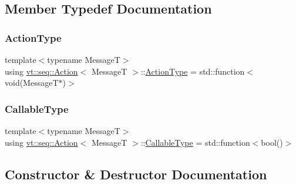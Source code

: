 \subsection{Member Typedef Documentation}
\mbox{\label{structvt_1_1seq_1_1_action_ae38fc2cf91f5654f548ea386ee603963}} 
\subsubsection{\texorpdfstring{Action\+Type}{ActionType}}
{\footnotesize\ttfamily template$<$typename MessageT$>$ \\
using \hyperlink{structvt_1_1seq_1_1_action}{vt\+::seq\+::\+Action}$<$ MessageT $>$\+::\hyperlink{structvt_1_1seq_1_1_action_ae38fc2cf91f5654f548ea386ee603963}{Action\+Type} =  std\+::function$<$void(MessageT$\ast$)$>$}

\mbox{\label{structvt_1_1seq_1_1_action_a6c683ecf97baa16ca6432b6773aa8f89}} 
\subsubsection{\texorpdfstring{Callable\+Type}{CallableType}}
{\footnotesize\ttfamily template$<$typename MessageT$>$ \\
using \hyperlink{structvt_1_1seq_1_1_action}{vt\+::seq\+::\+Action}$<$ MessageT $>$\+::\hyperlink{structvt_1_1seq_1_1_action_a6c683ecf97baa16ca6432b6773aa8f89}{Callable\+Type} =  std\+::function$<$bool()$>$}



\subsection{Constructor \& Destructor Documentation}
\mbox{\label{structvt_1_1seq_1_1_action_a054bffc215a985f7b3114ff877d980ba}} 
